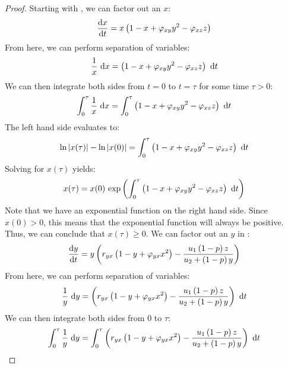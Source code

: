 \begin{proof}
    Starting with , we can factor out an $x$:
    \begin{equation*}
        \diff[]{x}{t} = x\left(1-x+\varphi_{xy}y^2-\varphi_{xz}z\right)
    \end{equation*}
    From here, we can perform separation of variables:
    \begin{equation*}
        \frac{1}{x}\ \mathrm{d}x = \left(1-x+\varphi_{xy}y^2-\varphi_{xz}z\right)\ \mathrm{d}t
    \end{equation*}
    We can then integrate both sides from $t=0$ to $t=\tau$ for some time $\tau>0$:
    \begin{equation*}
        \int_0^\tau \frac{1}{x}\ \opdiff{x} = \int_0^\tau \left(1-x+\varphi_{xy}y^2-\varphi_{xz}z\right)\ \opdiff{t}
    \end{equation*}
    The left hand side evaluates to:
    \begin{equation*}
        \text{ln}\left| x(\tau) \right|-\text{ln}\left| x(0) \right| = \int_0^\tau \left(1-x+\varphi_{xy}y^2-\varphi_{xz}z\right)\ \mathrm{d}t
    \end{equation*}
    Solving for $x(\tau)$ yields:
    \begin{equation*}
        x(\tau) = x(0)\ \text{exp}\left( \int_0^\tau \left(1-x+\varphi_{xy}y^2-\varphi_{xz}z\right)\ \mathrm{d}t \right)
    \end{equation*}
    Note that we have an exponential function on the right hand side. Since $x(0) > 0$, this means that the exponential function will always be positive. Thus, we can conclude that $x(\tau) \geq 0$. We can factor out an $y$ in :
    \begin{equation*}
        \diff[]{y}{t} = y\left(r_{yx}\left(1-y+\varphi_{yx}x^2\right)-\frac{u_1\left(1-p\right)z}{u_2+\left(1-p\right)y}\right)
    \end{equation*}
    From here, we can perform separation of variables:
    \begin{equation*}
        \frac{1}{y}\ \opdiff{y} = \left(r_{yx}\left(1-y+\varphi_{yx}x^2\right)-\frac{u_1\left(1-p\right)z}{u_2+\left(1-p\right)y}\right)\ \opdiff{t}
    \end{equation*}
    We can then integrate both sides from 0 to $\tau$:
    \begin{equation*}
        \int_0^\tau \frac{1}{y}\ \opdiff{y} = \int_0^\tau \left(r_{yx}\left(1-y+\varphi_{yx}x^2\right)-\frac{u_1\left(1-p\right)z}{u_2+\left(1-p\right)y}\right)\ \opdiff{t}
    \end{equation*}

\end{proof}
